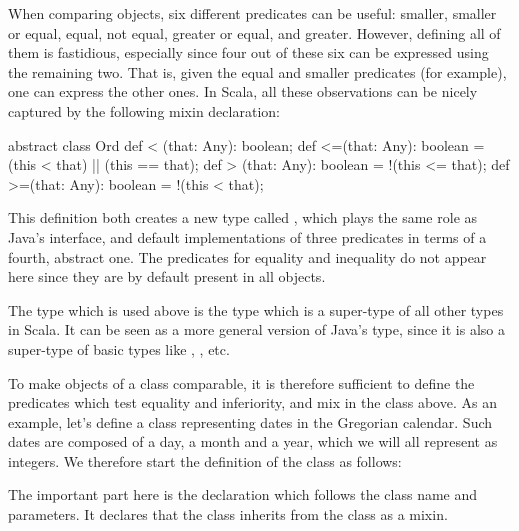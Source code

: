 \documentclass[a4paper,12pt,twoside,titlepage]{article}
\newcommand{\langname}[1]{#1\xspace}
\newcommand{\Scala}{\langname{Scala}}
\newcommand{\Java}{\langname{Java}}
\begin{document}
When comparing objects, six different predicates can be useful:
smaller, smaller or equal, equal, not equal, greater or equal, and
greater. However, defining all of them is fastidious, especially since
four out of these six can be expressed using the remaining two. That
is, given the equal and smaller predicates (for example), one can
express the other ones. In \Scala, all these observations can be
nicely captured by the following mixin declaration:
\begin{scalacode}
abstract class Ord {
  def < (that: Any): boolean;
  def <=(that: Any): boolean = (this < that) || (this == that);
  def > (that: Any): boolean = !(this <= that);
  def >=(that: Any): boolean = !(this < that);
} 
\end{scalacode}
This definition both creates a new type called , which
plays the same role as \Java's  interface, and
default implementations of three predicates in terms of a fourth,
abstract one. The predicates for equality and inequality do not appear
here since they are by default present in all objects.

The type  which is used above is the type which is a
super-type of all other types in \Scala. It can be seen as a more
general version of \Java's  type, since it is also a
super-type of basic types like , , etc.

To make objects of a class comparable, it is therefore sufficient to
define the predicates which test equality and inferiority, and mix in
the  class above. As an example, let's define a
 class representing dates in the Gregorian calendar. Such
dates are composed of a day, a month and a year, which we will all
represent as integers. We therefore start the definition of the
 class as follows:
\begin{scalacode}
class Date(y: int, m: int, d: int) with Ord {
  def year = y;
  def month = m;
  def day = d;

  override def toString(): String = year + "-" + month + "-" + day;
\end{scalacode}
The important part here is the  declaration which
follows the class name and parameters. It declares that the
 class inherits from the  class as a mixin.
\end{document}
